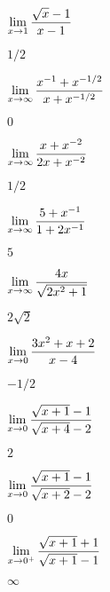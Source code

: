 \begin{exercises}
\begin{exercise} $\displaystyle\lim_{x\to1}{\sqrt{x}-1\over x-1}$
\begin{answer} $1/2$
\end{answer}\end{exercise}

\begin{exercise} $\displaystyle\lim_{x\to\infty}{x^{-1}+x^{-1/2}\over x+x^{-1/2}}$
\begin{answer} $0$
\end{answer}\end{exercise}

\begin{exercise} $\displaystyle\lim_{x\to\infty}{x+x^{-2}\over 2x+x^{-2}}$
\begin{answer} $1/2$
\end{answer}\end{exercise}

\begin{exercise} $\displaystyle\lim_{x\to\infty}{5+x^{-1}\over 1+2x^{-1}}$
\begin{answer} $5$
\end{answer}\end{exercise}

\begin{exercise} $\displaystyle\lim_{x\to\infty}{4x\over\sqrt{2x^2+1}}$
\begin{answer} $2\sqrt2$
\end{answer}\end{exercise}

\begin{exercise} $\displaystyle\lim_{x\to0}{3x^2+x+2\over x-4}$
\begin{answer} $-1/2$
\end{answer}\end{exercise}

\begin{exercise} $\displaystyle\lim_{x\to0}{\sqrt{x+1}-1\over \sqrt{x+4}-2}$
\begin{answer} $2$
\end{answer}\end{exercise}

\begin{exercise} $\displaystyle\lim_{x\to0}{\sqrt{x+1}-1\over \sqrt{x+2}-2}$
\begin{answer} $0$
\end{answer}\end{exercise}

\begin{exercise} $\displaystyle\lim_{x\to0^+}{\sqrt{x+1}+1\over\sqrt{x+1}-1}$
\begin{answer} $\infty$
\end{answer}\end{exercise}


\end{exercises}
